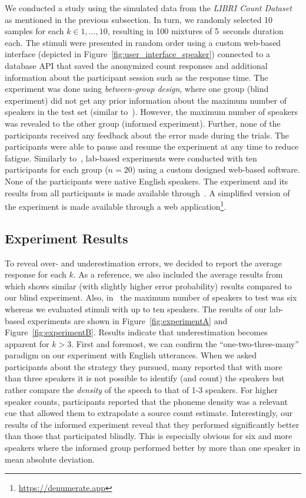 We conducted a study using the simulated data from the \emph{LIBRI Count Dataset} as mentioned in the previous subsection.
In turn, we randomly selected 10 samples for each \(k \in {1, \ldots, 10}\), resulting in 100 mixtures of 5~seconds duration each.
The stimuli were presented in random order using a custom web-based interface (depicted in Figure~\ref{fig:user_interface_speaker}) connected to a database API that saved the anonymized count responses and additional information about the participant session such as the response time.
The experiment was done using \emph{between-group design}, where one group (blind experiment) did not get any prior information about the maximum number of speakers in the test set (similar to~\cite{kawashima15}).
However, the maximum number of speakers was revealed to the other group (informed experiment).
Further, none of the participants received any feedback about the error made during the trials.
The participants were able to pause and resume the experiment at any time to reduce fatigue.
Similarly to~\cite{kawashima15}, lab-based experiments were conducted with ten participants for each group (\(n=20\)) using a custom designed web-based software.
None of the participants were native English speakers.
The experiment and its results from all participants is made available through~\cite{oss_countit}.
A simplified version of the experiment is made available through a web application\footnote{\url{https://denumerate.app}}.

\subsection{Experiment Results}
To reveal over- and underestimation errors, we decided to report the average response for each \(k\).
As a reference, we also included the average results from~\cite[Experiment 1, 5~seconds duration]{kawashima15} which shows similar (with slightly higher error probability) results compared to our blind experiment.
Also, in~\cite{kawashima15} the maximum number of speakers to test was six whereas we evaluated stimuli with up to ten speakers.
The results of our lab-based experiments are shown in Figure~\ref{fig:experimentA} and Figure~\ref{fig:experimentB}.
Results indicate that underestimation becomes apparent for \(k > 3\).
First and foremost, we can confirm the ``one-two-three-many'' paradigm on our experiment with English utterances.
When we asked participants about the strategy they pursued, many reported that with more than three speakers it is not possible to identify (and count) the speakers but rather compare the \emph{density} of the speech to that of 1-3 speakers.
For higher speaker counts, participants reported that the phoneme density was a relevant cue that allowed them to extrapolate a source count estimate.
Interestingly, our results of the informed experiment reveal that they performed significantly better than those that participated blindly.
This is especially obvious for six and more speakers where the informed group performed better by more than one speaker in mean absolute deviation.

